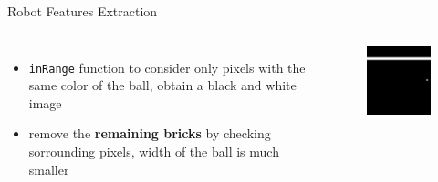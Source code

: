 \begin{frame}{Robot Features Extraction}
    \begin{columns}[c,onlytextwidth]
            \parbox{0.95\textwidth}{
                \begin{itemize}
                    \item \texttt{inRange} function to consider only pixels with
                        the same color of the ball, obtain a black and white image
                    \item remove the \textbf{remaining bricks} by checking
                        sorrounding pixels, width of the ball is much smaller
                \end{itemize}
            }
            \begin{figure}
                \includegraphics[width=\textwidth]{images/robotfeaturesextractorsequence/robotfeatures-bottom-part-mask.jpg}
            \end{figure}
    \end{columns}
\end{frame}

